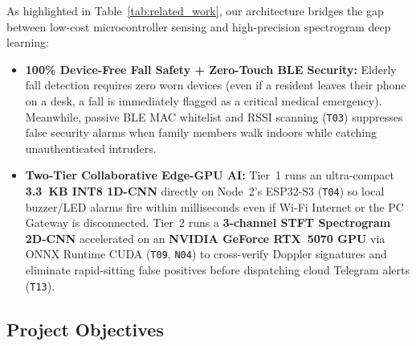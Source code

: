 \documentclass{hcmut-report}
\begin{document}
As highlighted in Table~\ref{tab:related_work}, our architecture bridges the gap between low-cost microcontroller sensing and high-precision spectrogram deep learning:
\begin{itemize}
  \item \textbf{100\% Device-Free Fall Safety + Zero-Touch BLE Security:} Elderly fall detection requires zero worn devices (even if a resident leaves their phone on a desk, a fall is immediately flagged as a critical medical emergency). Meanwhile, passive BLE MAC whitelist and RSSI scanning (\texttt{T03}) suppresses false security alarms when family members walk indoors while catching unauthenticated intruders.
  \item \textbf{Two-Tier Collaborative Edge-GPU AI:} Tier~1 runs an ultra-compact \textbf{3.3~KB INT8 1D-CNN} directly on Node~2's ESP32-S3 (\texttt{T04}) so local buzzer/LED alarms fire within milliseconds even if Wi-Fi Internet or the PC Gateway is disconnected. Tier~2 runs a \textbf{3-channel STFT Spectrogram 2D-CNN} accelerated on an \textbf{NVIDIA GeForce RTX~5070 GPU} via ONNX Runtime CUDA (\texttt{T09}, \texttt{N04}) to cross-verify Doppler signatures and eliminate rapid-sitting false positives before dispatching cloud Telegram alerts (\texttt{T13}).
\end{itemize}

\subsection[Project Objectives]{Project Objectives}
\label{sec:objectives}
\end{document}

